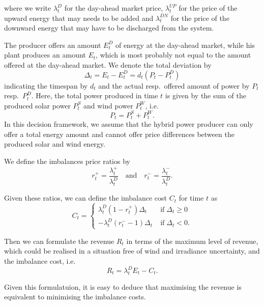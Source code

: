 where we write $\lambda_{t}^{D}$ for the day-ahead market price, $\lambda_{t}^{UP}$ for the price of the upward energy that may needs to be added and $\lambda_{t}^{DN}$ for the price of the downward energy that may have to be discharged from the system.

The producer offers an amount $E_{t}^{D}$ of energy at the day-ahead market, while his plant produces an amount $E_{t}$, which is most probably not equal to the amount offered at the day-ahead market. We denote the total deviation by 
\begin{equation*}
\Delta_{t}=E_{t}-E_{t}^{D}=d_{t}\left(P_{t}-P_{t}^{D}\right)
\end{equation*}
indicating the timespan by $d_{t}$ and the actual resp.\ offered amount of power by $P_{t}$ resp.\ $P_{t}^{D}$.
Here, the total power produced in time $t$ is given by the sum of the produced solar power $P_t^S$ and wind power $P_t^W$, i.e. 
$$ P_t = P_t^S + P_t^W.$$ In this decision framework, we assume that the hybrid power producer can only offer a total energy amount and cannot offer price differences between the produced solar and wind energy. 


We define the imbalances price ratios by  
\begin{equation*}
r_{t}^{+}= \frac{\lambda_{t}^{+}}{\lambda_{t}^{D}} \quad \mathrm{and} \quad r_{t}^{-}=\frac{\lambda_{t}^{-}}{\lambda_{t}^{D}}.
\end{equation*}

Given these ratios, we can define the imbalance cost $C_t$ for time $t$ as
\begin{equation*}
C_{t}=\begin{cases}
\lambda_{t}^D\left(1-r_{t}^{+}\right)\Delta_{t} &\mathrm{\; if \;} \Delta_{t}\ge 0
\\ -\lambda_{t}^{D}\left(r_{t}^{-}-1\right)\Delta_{t} &\mathrm{\; if \;} \Delta_{t}<0.
\end{cases}
\end{equation*}

Then we can formulate the revenue $R_t$ in terms of the maximum level of revenue, which could be realised in a situation free of wind and irradiance uncertainty, and the imbalance cost, i.e. 
\begin{equation*}
R_{t}=\lambda_{t}^{D}E_{t}-C_{t}.
\end{equation*}

Given this formulatuion, it is easy to deduce that maximising the revenue is equivalent to minimising the imbalance costs.

